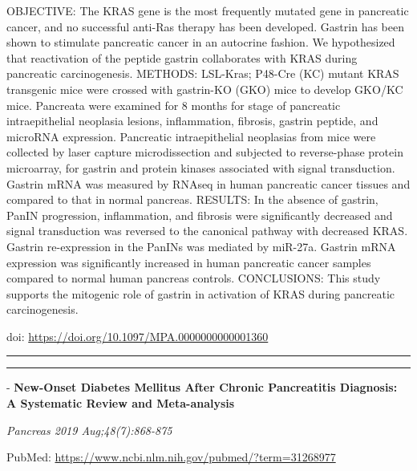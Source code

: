 \documentclass[]{article}
\begin{document}
OBJECTIVE: The KRAS gene is the most frequently mutated gene in
pancreatic cancer, and no successful anti-Ras therapy has been
developed. Gastrin has been shown to stimulate pancreatic cancer in an
autocrine fashion. We hypothesized that reactivation of the peptide
gastrin collaborates with KRAS during pancreatic carcinogenesis.
METHODS: LSL-Kras; P48-Cre (KC) mutant KRAS transgenic mice were crossed
with gastrin-KO (GKO) mice to develop GKO/KC mice. Pancreata were
examined for 8 months for stage of pancreatic intraepithelial neoplasia
lesions, inflammation, fibrosis, gastrin peptide, and microRNA
expression. Pancreatic intraepithelial neoplasias from mice were
collected by laser capture microdissection and subjected to
reverse-phase protein microarray, for gastrin and protein kinases
associated with signal transduction. Gastrin mRNA was measured by RNAseq
in human pancreatic cancer tissues and compared to that in normal
pancreas. RESULTS: In the absence of gastrin, PanIN progression,
inflammation, and fibrosis were significantly decreased and signal
transduction was reversed to the canonical pathway with decreased KRAS.
Gastrin re-expression in the PanINs was mediated by miR-27a. Gastrin
mRNA expression was significantly increased in human pancreatic cancer
samples compared to normal human pancreas controls. CONCLUSIONS: This
study supports the mitogenic role of gastrin in activation of KRAS
during pancreatic carcinogenesis.

doi: \url{https://doi.org/10.1097/MPA.0000000000001360}

{}

{}

\begin{center}\rule{0.5\linewidth}{\linethickness}\end{center}

\begin{center}\rule{0.5\linewidth}{\linethickness}\end{center}

 - \textbf{New-Onset Diabetes Mellitus After Chronic Pancreatitis
Diagnosis: A Systematic Review and Meta-analysis}

\emph{Pancreas 2019 Aug;48(7):868-875}

PubMed: \url{https://www.ncbi.nlm.nih.gov/pubmed/?term=31268977}
\end{document}
